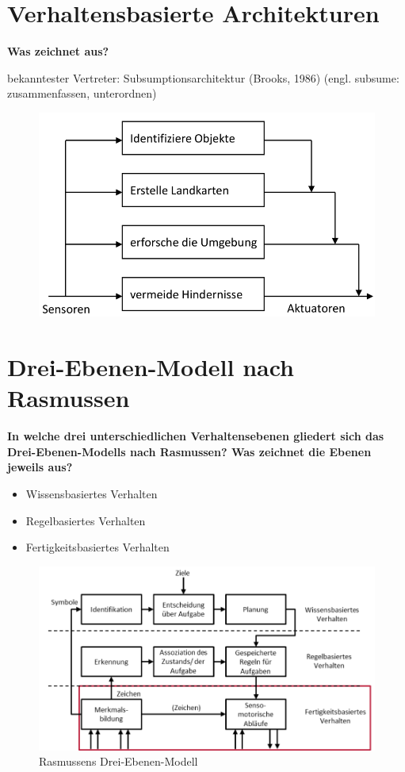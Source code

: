 \section{Verhaltensbasierte Architekturen}
\textbf{Was zeichnet  aus?}

bekanntester Vertreter: Subsumptionsarchitektur (Brooks, 1986)
(engl. subsume: zusammenfassen, unterordnen)
\begin{figure}[H]
    \centering
    \includegraphics[width=.3\linewidth]{Graphics/subsumptionsarchitektur.png}
\end{figure}

\section{Drei-Ebenen-Modell nach Rasmussen}
\textbf{In welche drei unterschiedlichen Verhaltensebenen gliedert sich das Drei-Ebenen-Modells nach Rasmussen? Was zeichnet die Ebenen jeweils aus?}

\begin{itemize}
    \item Wissensbasiertes Verhalten
    \item Regelbasiertes Verhalten
    \item Fertigkeitsbasiertes Verhalten
\end{itemize}
\begin{figure}[H]
    \centering
    \includegraphics[width=.6\linewidth]{Graphics/Rasmussens_Drei_Ebenen_Medell.png}
    \caption{Rasmussens Drei-Ebenen-Modell}
\end{figure}